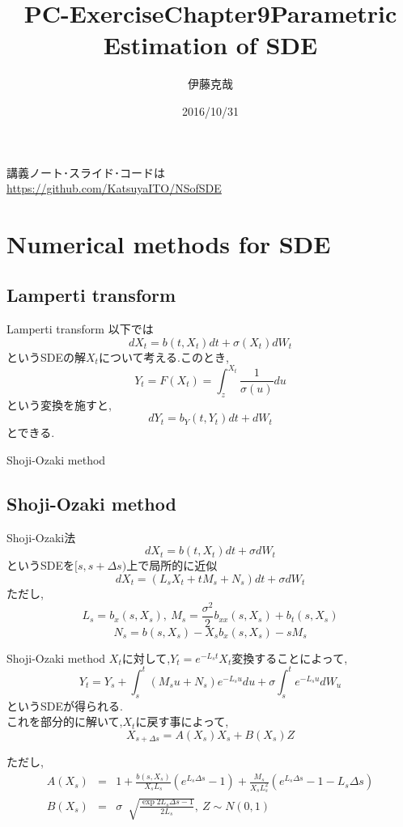 \documentclass[dvipdfmx,cjk]{beamer}
\title{PC-ExerciseChapter9}
\numberwithin{equation}{section}
\def\eqa{\begin{eqnarray}}
\def\eqax{\end{eqnarray}}
\begin{document}
\title[Parametric Estimation of SDE]{Parametric Estimation of SDE} 
\author[Katsuya ITO]{伊藤克哉} 
\date{2016/10/31}

\begin{frame}
\titlepage    
\end{frame}
\begin{frame}
講義ノート･スライド･コードは\\
\url{https://github.com/KatsuyaITO/NSofSDE}
\end{frame}
\begin{frame}
\tableofcontents
\end{frame}

\section{Numerical methods for SDE}

\subsection{Lamperti transform}
\begin{frame}{Lamperti transform}
以下では
\[
dX_t = b(t,X_t)dt + \sigma(X_t)dW_t
\]
というSDEの解$X_t$について考える.このとき,
\[
Y_t = F(X_t) = \int_z^{X_t} \frac{1}{\sigma(u)}du
\]
という変換を施すと,
\[
dY_t = b_Y (t,Y_t)dt + dW_t
\]
とできる.
\end{frame}
\begin{frame}{Shoji-Ozaki method}
\subsection{Shoji-Ozaki method}
Shoji-Ozaki法
\[
dX_t = b (t,X_t) dt + \sigma dW_t
\]
というSDEを$[s,s+\Delta s)$上で局所的に近似
\[
dX_t = (L_s X_t + tM_s + N_s )dt+ \sigma  dW_t
\]
ただし,
\[
L_s = b_x(s,X_s) , \ M_s = \frac{\sigma^2}{2} b_{xx} (s,X_s) + b_t(s,X_s)
\]
\[
N_s = b(s,X_s) - X_s b_x(s,X_s) - sM_s
\]

\end{frame}

\begin{frame}{Shoji-Ozaki method}
$X_t$に対して,$Y_t = e^{-L_s t } X_t $変換することによって,
\[
Y_t = Y_s + \int_s^t (M_s u + N_s ) e^{-L_s u} du + \sigma \int_{s}^t e^{-L_s u} dW_u
\]
というSDEが得られる.\\
\pause
これを部分的に解いて,$X_t$に戻す事によって,
\[
X_{s+\Delta s} = A(X_s)X_s + B(X_s) Z
\]

ただし,
\eqa
A(X_s) &=& 1 + \frac{b(s,X_s)}{X_s L_s} (e^{L_s \Delta s} -1 ) +
\frac{M_s}{X_s L_s^2} (e^{L_s \Delta s} -1  - L_s \Delta s) \\
B(X_s) &=& \sigma\ \sqrt[]{ \frac{\exp{2L_s \Delta s} -1 }{2L_s}},\ Z\sim N(0,1)
\eqax

\end{frame}
\end{document}
